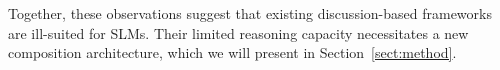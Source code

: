 Together, these observations suggest that existing discussion-based frameworks are ill-suited for SLMs. Their limited reasoning capacity necessitates a new composition architecture, which we will present in Section~\ref{sect:method}.






